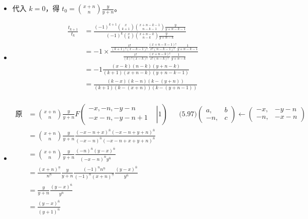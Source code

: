 \documentclass[11pt]{article}
\begin{document}
\begin{itemize}
	\item 代入 $k = 0$，得 $t_0 = \binom{x+n}{n} \frac{y}{y+n}$。
	\item 
		\begin{align*}
			\frac{t_{k+1}}{t_k} 
				&= \frac{(-1)^{k+1} \binom{x}{k+1} \binom{x+n-k-1}{n-k-1} \frac{y}{y+n-k-1}}{(-1)^{k} \binom{x}{k} \binom{x+n-k}{n-k} \frac{y}{y+n-k}} \\
				&= -1 \times \frac{\frac{x!}{(k+1)!(x-k-1)!}\frac{(x+n-k-1)!}{x!(n-k-1)!}\frac{1}{y+n-k-1}}{\frac{x!}{(k)!(x-k)!}\frac{(x+n-k)!}{x!(n-k)!}\frac{1}{y+n-k}} \\
				&= -1 \frac{(x-k)(n-k)(y+n-k)}{(k+1)(x+n-k)(y+n-k-1)} \\
				&= \frac{(k-x)(k-n)(k-(y+n))}{(k+1)(k-(x+n))(k-(y+n-1))} \\
		\end{align*}
	\item 
		\begin{align*}
			\text{原式}
				&= \binom{x+n}{n} \frac{y}{y+n} 
					F \left (\left.\begin{matrix} -x, -n, -y-n & \\  -x-n, -y-n+1 & 
								\end{matrix}\right|1 \right ) 
					&& \text{(5.97)}
						\begin{pmatrix}
							a, & b \\
							-n, & c 
						\end{pmatrix}\leftarrow
						\begin{pmatrix}
							-x, & -y-n \\
							-n, & -x-n
						\end{pmatrix} \\
				&= \binom{x+n}{n} \frac{y}{y+n} 
					\frac{(-x-n+x)^{\overline{n}} (-x-n+y+n)^{\overline{n}}}
					{(-x-n)^{\overline{n}} (-x-n+x+y+n)^{\overline{n}}} \\
				&= \binom{x+n}{n} \frac{y}{y+n}
						\frac{(-n)^{\overline{n}} (y-x)^{\overline{n}}}
						{(-x-n)^{\overline{n}} y^{\overline{n}}} \\
				&= \frac{(x+n)^{\underline{n}}}{n^{\underline{n}}} \frac{y}{y+n}
						\frac{(-1)^n n^{\underline{n}}}{(-1)^n (x+n)^{\underline{n}}}
						\frac{(y-x)^{\overline{n}}}{y^{\overline{n}}} \\
				&= \frac{y}{y+n} \frac{(y-x)^{\overline{n}}}{y^{\overline{n}}} \\
				&= \frac{(y-x)^{\overline{n}}}{(y+1)^{\overline{n}}}
		\end{align*}
\end{itemize}
\end{document}
